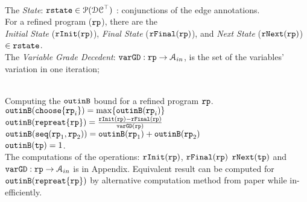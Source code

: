 \\
The \emph{State}: 
${\mathtt{rstate}} \in \mathcal{P}(\mathcal{DC}^{\top})$ : conjunctions of the edge annotations.
\\
For a refined program (${\mathtt{rp}}$), there are the 
\\
\emph{Initial State} (${\mathtt{rInit}}({\mathtt{rp}})$), 
\emph{Final State} (${\mathtt{rFinal}}({\mathtt{rp}})$), and \emph{Next State} (${\mathtt{rNext}}({\mathtt{rp}})$)  $\in {\mathtt{rstate}}$.
\\
The \emph{Variable Grade Decedent}: ${\mathtt{varGD}} : {\mathtt{rp}} \to \mathcal{A}_{in}$, is the set of the variables' variation in one iteration;

\\
Computing the ${\mathtt{outinB}}$ bound for a refined program ${\mathtt{rp}}$. 
\\
${\mathtt{outinB}}({\mathtt{choose}}\{{\mathtt{rp}}_i\}) =  \max\{{\mathtt{outinB}}({\mathtt{rp}}_i)\}$
\\
${\mathtt{outinB}}({\mathtt{repreat}}\{{\mathtt{rp}}\}) =  \frac{{\mathtt{rInit}}({\mathtt{rp}}) - {\mathtt{rFinal}}({\mathtt{rp}})}{{\mathtt{varGD}}({\mathtt{rp}})}$
\\
${\mathtt{outinB}}({\mathtt{seq}}({\mathtt{rp}}_1, {\mathtt{rp}}_2)) =  {\mathtt{outinB}}({\mathtt{rp}}_1)+ {\mathtt{outinB}}( {\mathtt{rp}}_2)$
\\
${\mathtt{outinB}}({\mathtt{tp}}) =  1$.
\\
The computations of the operations: ${\mathtt{rInit}}({\mathtt{rp}})$,
${\mathtt{rFinal}}({\mathtt{rp}})$ ${\mathtt{rNext}}({\mathtt{tp}})$ and ${\mathtt{varGD}} : {\mathtt{rp}} \to \mathcal{A}_{in}$ is in Appendix.
Equivalent result can be computed for ${\mathtt{outinB}}({\mathtt{repreat}}\{{\mathtt{rp}}\})$ by alternative computation method from paper \cite{GulwaniJK09} while in-efficiently.
